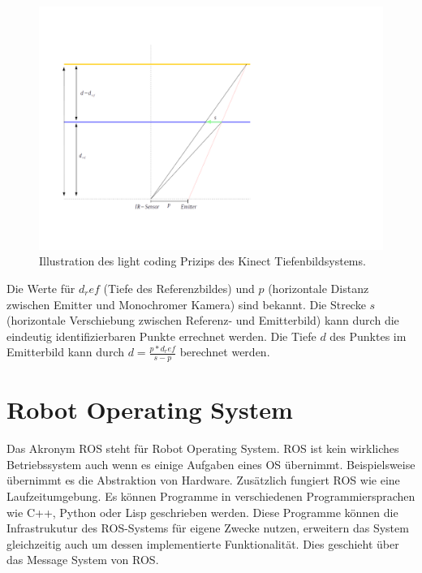 			\begin{figure}[H]
			\centering
			\includegraphics[width=1.2\linewidth]{../media/kinect-depth-principle}
			\caption{Illustration des light coding Prizips des Kinect Tiefenbildsystems.}
			\label{fig:kinect-depth-principle}
			\end{figure}
			Die Werte für $d_ref$ (Tiefe des Referenzbildes) und $p$ (horizontale Distanz zwischen Emitter und Monochromer Kamera) sind bekannt. Die Strecke $s$ (horizontale Verschiebung zwischen Referenz- und Emitterbild) kann durch die eindeutig identifizierbaren Punkte errechnet werden. Die Tiefe $d$ des Punktes im Emitterbild kann durch $d = \frac{p*d_ref}{s-p}$ berechnet werden.\\
			\cite{kinect-uug-chem}

			

	\section{Robot Operating System}
	Das Akronym ROS steht für Robot Operating System. ROS ist kein wirkliches Betriebssystem auch wenn es einige Aufgaben eines OS übernimmt. Beispielsweise übernimmt es die Abstraktion von Hardware. Zusätzlich fungiert ROS wie eine Laufzeitumgebung. Es können Programme in verschiedenen Programmiersprachen wie C++, Python oder Lisp geschrieben werden. Diese Programme können die Infrastrukutur des ROS-Systems für eigene Zwecke nutzen, erweitern das System gleichzeitig auch um dessen implementierte Funktionalität. Dies geschieht über das Message System von ROS.
